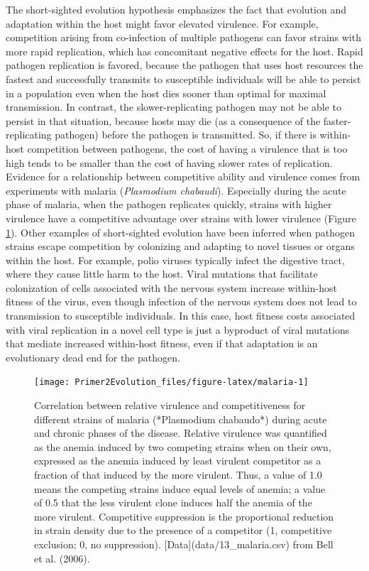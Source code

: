 \documentclass[
]{book}
\begin{document}
The short-sighted evolution hypothesis emphasizes the fact that evolution and adaptation within the host might favor elevated virulence. For example, competition arising from co-infection of multiple pathogens can favor strains with more rapid replication, which has concomitant negative effects for the host. Rapid pathogen replication is favored, because the pathogen that uses host resources the fastest and successfully transmits to susceptible individuals will be able to persist in a population even when the host dies sooner than optimal for maximal transmission. In contrast, the slower-replicating pathogen may not be able to persist in that situation, because hosts may die (as a consequence of the faster-replicating pathogen) before the pathogen is transmitted. So, if there is within-host competition between pathogens, the cost of having a virulence that is too high tends to be smaller than the cost of having slower rates of replication. Evidence for a relationship between competitive ability and virulence comes from experiments with malaria (\emph{Plasmodium chabaudi}). Especially during the acute phase of malaria, when the pathogen replicates quickly, strains with higher virulence have a competitive advantage over strains with lower virulence (Figure \ref{fig:malaria}). Other examples of short-sighted evolution have been inferred when pathogen strains escape competition by colonizing and adapting to novel tissues or organs within the host. For example, polio viruses typically infect the digestive tract, where they cause little harm to the host. Viral mutations that facilitate colonization of cells associated with the nervous system increase within-host fitness of the virus, even though infection of the nervous system does not lead to transmission to susceptible individuals. In this case, host fitness costs associated with viral replication in a novel cell type is just a byproduct of viral mutations that mediate increased within-host fitness, even if that adaptation is an evolutionary dead end for the pathogen.

\begin{figure}
\texttt{[image: Primer2Evolution\_files/figure-latex/malaria-1]} \caption{Correlation between relative virulence and competitiveness for different strains of malaria (*Plasmodium chabaudo*) during acute and chronic phases of the disease. Relative virulence was quantified as the anemia induced by two competing strains when on their own, expressed as the anemia induced by least virulent competitor as a fraction of that induced by the more virulent. Thus, a value of 1.0 means the competing strains induce equal levels of anemia; a value of 0.5 that the less virulent clone induces half the anemia of the more virulent. Competitive suppression is the proportional reduction in strain density due to the presence of a competitor (1, competitive exclusion; 0, no suppression). [Data](data/13_malaria.csv) from Bell et al. (2006).}\label{fig:malaria}
\end{figure}
\end{document}
